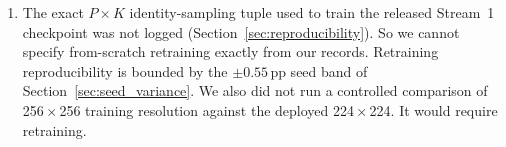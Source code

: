 \begin{enumerate}
  \item The exact $P \times K$ identity-sampling tuple used to train the released Stream~1 checkpoint was not logged (Section~\ref{sec:reproducibility}). So we cannot specify from-scratch retraining exactly from our records. Retraining reproducibility is bounded by the $\pm0.55$\,pp seed band of Section~\ref{sec:seed_variance}. We also did not run a controlled comparison of 256\,$\times$\,256 training resolution against the deployed 224\,$\times$\,224. It would require retraining.
\end{enumerate}
